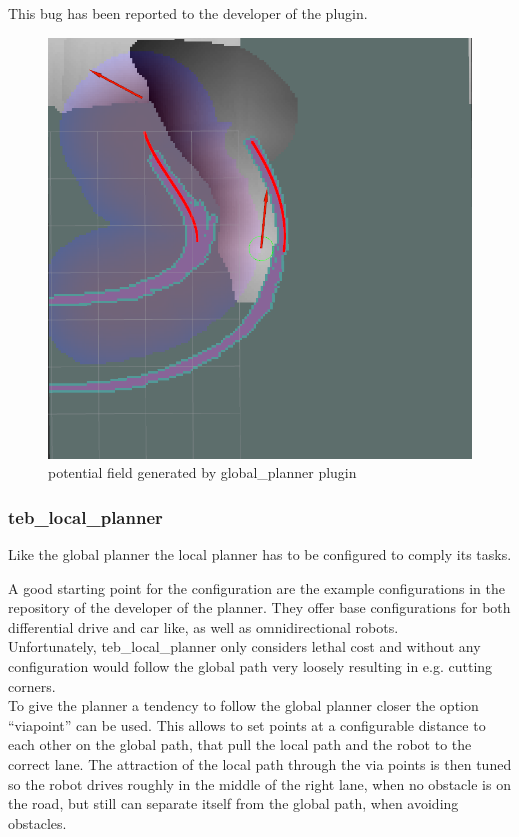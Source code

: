  This bug has been reported to the developer of the plugin.
 
 \begin{figure}[H]
 	\centering
 	\includegraphics[width=.7\textwidth]{Pictures/out of bounds}	
 	
 	\caption{potential field generated by global\_planner plugin}
 	\label{potentialfield}
 \end{figure}


\subsubsection{teb\_local\_planner}

Like the global planner the local planner has to be configured to comply its tasks.

A good starting point for the configuration are the example configurations in the repository of the developer of the planner\cite{tebtutorials}. They offer base configurations for both differential drive and car like, as well as omnidirectional robots.\\

Unfortunately, teb\_local\_planner only considers lethal cost and without any configuration would follow the global path very loosely resulting in e.g. cutting corners.\\ 

To give the planner a tendency to follow the global planner closer the option ``viapoint'' can be used. This allows to set points at a configurable distance to each other on the global path, that pull the local path and the robot to the correct lane. The attraction of the local path through the via points is then tuned so the robot drives roughly in the middle of the right lane, when no obstacle is on the road, but still can separate itself from the global path, when avoiding obstacles.\\

